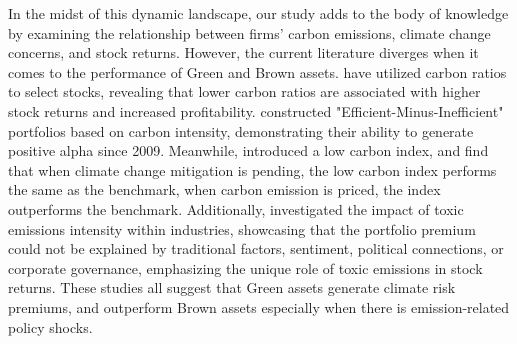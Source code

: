 \documentclass[12pt]{article}
\begin{document}
In the midst of this dynamic landscape, our study adds to the body of knowledge by examining the relationship between firms' carbon emissions, climate change concerns, and stock returns. However, the current literature diverges when it comes to the performance of Green and Brown assets.  \cite{garvey2018carbon} have utilized carbon ratios to select stocks, revealing that lower carbon ratios are associated with higher stock returns and increased profitability. \cite{in2017being} constructed "Efficient-Minus-Inefficient" portfolios based on carbon intensity, demonstrating their ability to generate positive alpha since 2009. Meanwhile, \cite{andersson2016hedging} introduced a low carbon index, and find that when climate change mitigation is pending, the low carbon index performs the same as the benchmark, when carbon emission is priced, the index outperforms the benchmark. Additionally, \cite{hsu2023pollution} investigated the impact of toxic emissions intensity within industries, showcasing that the portfolio premium could not be explained by traditional factors, sentiment, political connections, or corporate governance, emphasizing the unique role of toxic emissions in stock returns. These studies all suggest that Green assets generate climate risk premiums, and outperform Brown assets especially when there is emission-related policy shocks.
\end{document}
